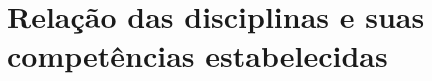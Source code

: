 \documentclass[12pt, oneside]{book}
\begin{document}
\chapter{Relação das disciplinas e suas competências estabelecidas}
\label{cha:relacao-das-disciplinas}






\end{document}
